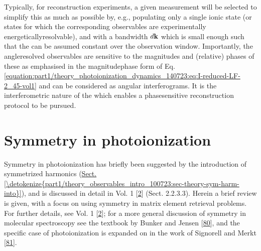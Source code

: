 \documentclass[letterpaper,table,10pt,english]{jupyterBook}
\begin{document}
\sphinxAtStartPar
Typically, for reconstruction experiments, a given measurement will be
selected to simplify this as much as possible by, e.g., populating only
a single ionic state (or states for which the corresponding observables
are experimentally energetically\sphinxhyphen{}resolvable), and with a bandwidth
\(d\bf{k}\) which is small enough such that the {\hyperref[\detokenize{backmatter/glossary:term-radial-matrix-elements}]{}} can be
assumed constant over the observation window. Importantly, the angle\sphinxhyphen{}resolved observables are
sensitive to the magnitudes and (relative) phases of these {\hyperref[\detokenize{backmatter/glossary:term-radial-matrix-elements}]{}} \sphinxhyphen{} as emphasised in the magnitude\sphinxhyphen{}phase form of Eq. \eqref{equation:part1/theory_photoionization_dynamics_140723:eq:I-reduced-LF-2_45-vol1} \sphinxhyphen{} and can be considered as angular interferograms. It is the interferometric nature of the {\hyperref[\detokenize{backmatter/glossary:term-PADs}]{}} which enables a phase\sphinxhyphen{}sensitive reconstruction protocol to be pursued.

\sphinxstepscope


\section{Symmetry in photoionization}
\label{\detokenize{part1/theory_symmetry_140723:symmetry-in-photoionization}}\label{\detokenize{part1/theory_symmetry_140723:sec-theory-symmetry-intro}}\label{\detokenize{part1/theory_symmetry_140723::doc}}
\sphinxAtStartPar
Symmetry in photoionization has briefly been suggested by the introduction of symmetrized harmonics (\hyperref[\detokenize{part1/theory_observables_intro_100723:sec-theory-sym-harm-into}]{Sect.\@ \ref{\detokenize{part1/theory_observables_intro_100723:sec-theory-sym-harm-into}}}), and is discussed in detail in  Vol. 1 {[}\hyperlink{cite.backmatter/bibliography:id663}{2}{]} (Sect. 2.2.3.3). Herein a brief review is given, with a focus on using symmetry in matrix element retrieval problems. For further details, see  Vol. 1 {[}\hyperlink{cite.backmatter/bibliography:id663}{2}{]}; for a more general discussion of symmetry in molecular spectroscopy see the textbook by  Bunker and Jensen {[}\hyperlink{cite.backmatter/bibliography:id538}{80}{]}, and the specific case of photoionization is expanded on in the work of Signorell and Merkt {[}\hyperlink{cite.backmatter/bibliography:id869}{81}{]}.
\end{document}
